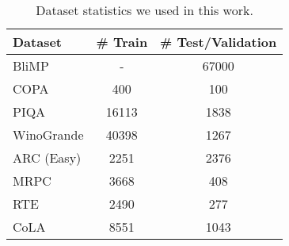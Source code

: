 \begin{table}
\centering
\footnotesize
\begin{tabular}{
    l@{\hskip 0.6in}
    c
    c
}
\toprule 
Dataset       &  \# Train  & \# Test/Validation  \\
\midrule
BliMP & - & 67000 \\
COPA & 400 & 100 \\
PIQA & 16113 & 1838 \\
WinoGrande & 40398 & 1267 \\
ARC (Easy) & 2251 & 2376 \\
MRPC & 3668 & 408 \\
RTE & 2490 & 277 \\
CoLA & 8551 & 1043 \\

\bottomrule
\end{tabular}
\caption{Dataset statistics we used in this work.}
\label{tab:dataset_detail}
\end{table}
